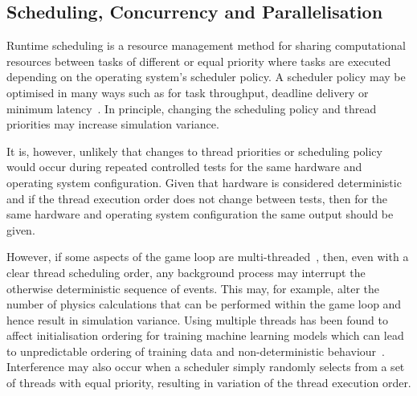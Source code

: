 \documentclass[letterpaper, 10 pt, journal, twoside]{IEEEtran}
\begin{document}
\subsection{Scheduling, Concurrency and Parallelisation}
Runtime scheduling is a resource management method for sharing computational resources between tasks of different or equal priority where tasks are executed depending on the operating system's scheduler policy. A scheduler policy may be optimised in many ways such as for task throughput, deadline delivery or minimum latency~\cite{liu1973scheduling}. 
%
In principle, changing the scheduling policy and thread priorities may increase simulation variance. 

It is, however, unlikely that changes to thread priorities or scheduling policy would occur during repeated controlled tests for the same hardware and operating system configuration. Given that hardware is considered deterministic and if the thread execution order does not change between tests, then for the same hardware and operating system configuration the same output should be given.  

However, if some aspects of the game loop are multi-threaded~\cite{unity_multithreading}, then, even with a clear thread scheduling order, any background process may interrupt the otherwise deterministic sequence of events. This may, for example, alter the number of physics calculations that can be performed within the game loop and hence result in simulation variance.
%
Using multiple threads has been found to affect initialisation ordering for training machine learning models which can lead to unpredictable ordering of training data and non-deterministic behaviour~\cite{Sculley2015,Breck2017}.
%
%
Interference may also occur when a scheduler simply randomly selects from a set of threads with equal priority, resulting in variation of the thread execution order.
\end{document}

